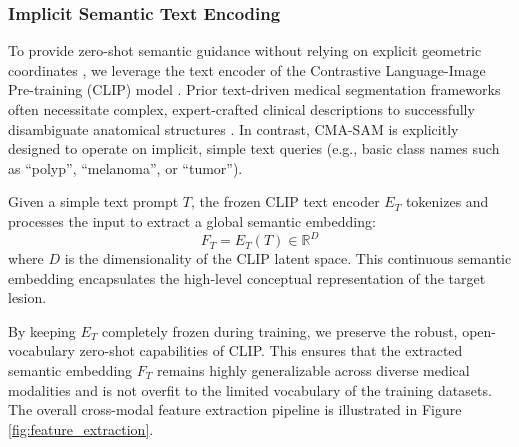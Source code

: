 \documentclass[onecolumn]{IEEEtran}
\numberwithin{equation}{section}
\theoremstyle{definition}
\theoremstyle{remark}
\begin{document}
\subsubsection{Implicit Semantic Text Encoding}

To provide zero-shot semantic guidance without relying on explicit geometric coordinates \cite{mazurowski2023segment}, we leverage the text encoder of the Contrastive Language-Image Pre-training (CLIP) model \cite{radford2021learning}. Prior text-driven medical segmentation frameworks often necessitate complex, expert-crafted clinical descriptions to successfully disambiguate anatomical structures \cite{wang2022medclip, zhang2025biomedclip}. In contrast, CMA-SAM is explicitly designed to operate on implicit, simple text queries (e.g., basic class names such as ``polyp'', ``melanoma'', or ``tumor'').

Given a simple text prompt $T$, the frozen CLIP text encoder $E_T$ tokenizes and processes the input to extract a global semantic embedding:
\begin{equation}
    F_T = E_T(T) \in \mathbb{R}^{D}
\end{equation}
where $D$ is the dimensionality of the CLIP latent space. This continuous semantic embedding encapsulates the high-level conceptual representation of the target lesion. 

By keeping $E_T$ completely frozen during training, we preserve the robust, open-vocabulary zero-shot capabilities of CLIP. This ensures that the extracted semantic embedding $F_T$ remains highly generalizable across diverse medical modalities and is not overfit to the limited vocabulary of the training datasets. The overall cross-modal feature extraction pipeline is illustrated in Figure \ref{fig:feature_extraction}.
\end{document}
